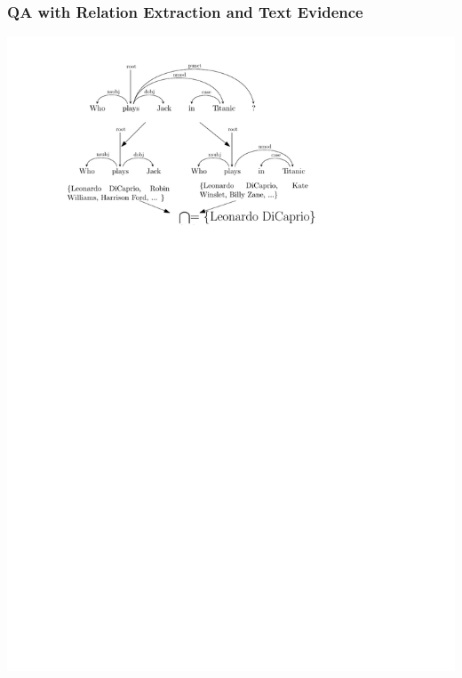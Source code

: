 \documentclass[mathserif,12pt]{beamer}
\begin{document}
\begin{frame}
\frametitle{QA with Relation Extraction and Text Evidence}
\centering
\includegraphics[scale=0.8]{figures/natural-logic-flowchart}
\end{frame}
\end{document}

